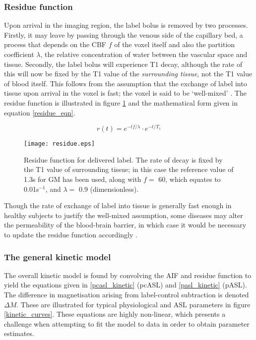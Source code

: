 \subsubsection{Residue function}

Upon arrival in the imaging region, the label bolus is removed by two processes. Firstly, it may leave by passing through the venous side of the capillary bed, a process that depends on the CBF $f$ of the voxel itself and also the partition coefficient $\lambda$, the relative concentration of water between the vascular space and tissue. Secondly, the label bolus will experience T1 decay, although the rate of this will now be fixed by the T1 value of the \textit{surrounding tissue}, not the T1 value of blood itself. This follows from the assumption that the exchange of label into tissue upon arrival in the voxel is fast; the voxel is said to be `well-mixed' \cite{Buxton1998}. The residue function is illustrated in figure \ref{residue_fig} and the mathematical form given in equation \ref{residue_eqn}. 

\begin{equation}
r(t) = e^{-tf/\lambda} \cdot e^{-t/T_{1}}
\label{residue_eqn}
\end{equation}

\begin{figure}[H]
\centering
\texttt{[image: residue.eps]}
\caption{Residue function for delivered label. The rate of decay is fixed by the T1 value of surrounding tissue; in this case the reference value of 1.3s for GM has been used, along with $f =$ 60\cbf{}, which equates to 0.01s$^{-1}$, and $\lambda =$ 0.9 (dimensionless).}
\label{residue_fig}
\end{figure}

Though the rate of exchange of label into tissue is generally fast enough in healthy subjects to justify the well-mixed assumption, some diseases may alter the permeability of the blood-brain barrier, in which case it would be necessary to update the residue function accordingly \cite{asl_primer}. 

\subsubsection{The general kinetic model}

The overall kinetic model is found by convolving the AIF and residue function to yield the equations given in \ref{pcasl_kinetic} (pcASL) and \ref{pasl_kinetic} (pASL). The difference in magnetisation arising from label-control subtraction is denoted $\Delta M$. These are illustrated for typical physiological and ASL parameters in figure \ref{kinetic_curves}. These equations are highly non-linear, which presents a challenge when attempting to fit the model to data in order to obtain parameter estimates. 

